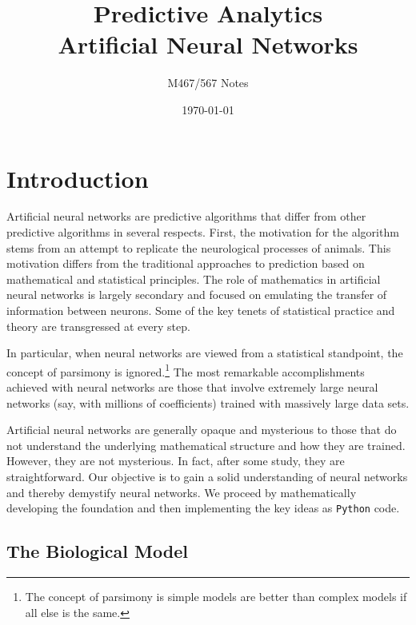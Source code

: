 \documentclass[graybox,envcountchap]{svmono}
\title{Predictive Analytics \\\vspace{.2 in } \Large Artificial Neural Networks\normalsize}
\author[1]{M467/567 Notes }
\date{\today}
\newcommand{\nn}{neural network}
\newcommand{\tx}{\texttt}
\begin{document}
\setcounter{chapter}{0}
 


\maketitle

\chapter{Introduction}

Artificial neural networks are predictive algorithms that differ from other predictive algorithms in several respects. First, the motivation for the algorithm stems from an attempt to replicate the neurological processes of animals. This motivation differs from the traditional approaches to prediction based on mathematical and statistical principles. The role of mathematics in artificial neural networks is largely secondary and focused on emulating the transfer of information between neurons. Some of the key tenets of statistical practice and theory are transgressed at every step.

In particular, when \nn s are viewed from a statistical standpoint, the concept of parsimony is ignored.\footnote{The concept of parsimony is simple models are better than complex models if all else is the same.   }  The most remarkable accomplishments achieved with {\nn }s are those that involve extremely  large neural networks (say, with millions of coefficients) trained with massively large data sets.

Artificial neural networks are generally opaque and mysterious to those that do not understand the underlying mathematical structure and how they are trained. However, they are not mysterious. In fact, after some study, they are straightforward.  Our objective is to gain a solid understanding of \nn s and thereby demystify \nn s.  We proceed by mathematically developing the foundation and then implementing the key ideas as \tx{Python} code.

\section{The Biological Model}\label{section:bioModel}
\end{document}
